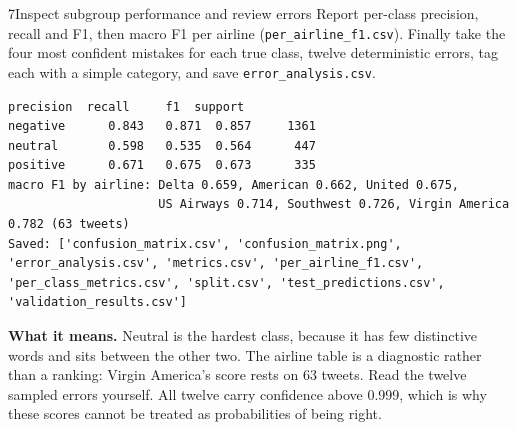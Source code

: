 \begin{labquestion}{7}{Inspect subgroup performance and review errors}
Report per-class precision, recall and F1, then macro F1 per airline (\texttt{per\_airline\_f1.csv}). Finally take the four most confident mistakes for each true class, twelve deterministic errors, tag each with a simple category, and save \texttt{error\_analysis.csv}.
\end{labquestion}
\begin{labanswer}

\begin{refoutput}
\begin{lstlisting}[style=utpterminal]
          precision  recall     f1  support
negative      0.843   0.871  0.857     1361
neutral       0.598   0.535  0.564      447
positive      0.671   0.675  0.673      335
macro F1 by airline: Delta 0.659, American 0.662, United 0.675,
                     US Airways 0.714, Southwest 0.726, Virgin America 0.782 (63 tweets)
Saved: ['confusion_matrix.csv', 'confusion_matrix.png', 'error_analysis.csv', 'metrics.csv', 'per_airline_f1.csv', 'per_class_metrics.csv', 'split.csv', 'test_predictions.csv', 'validation_results.csv']
\end{lstlisting}
\end{refoutput}

\textbf{What it means.} Neutral is the hardest class, because it has few distinctive words and sits between the other two. The airline table is a diagnostic rather than a ranking: Virgin America's score rests on 63 tweets. Read the twelve sampled errors yourself. All twelve carry confidence above 0.999, which is why these scores cannot be treated as probabilities of being right.
\end{labanswer}

